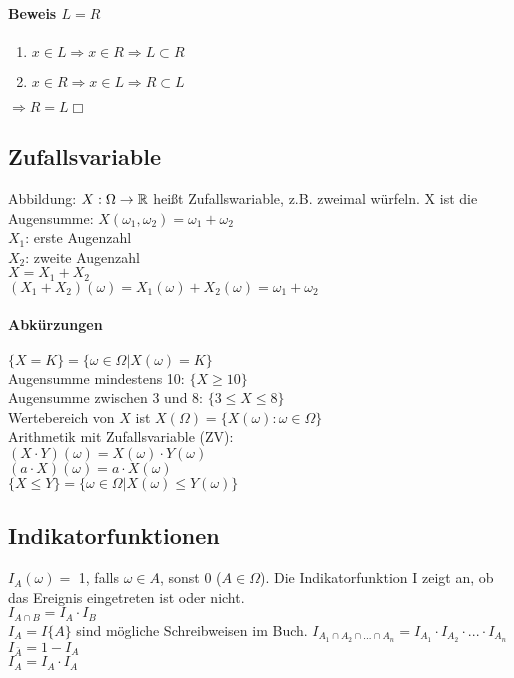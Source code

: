 \paragraph{Beweis $ L = R $}
\begin{enumerate}
\item $x \in L \Rightarrow x\in R \Rightarrow L \subset R $
\item $x \in R \Rightarrow x\in L \Rightarrow R \subset L $
\end{enumerate}
$\Rightarrow R=L \Box$\\

\subsection{Zufallsvariable}

Abbildung: $ X: \Omega \rightarrow \mathbb{R}$ heißt Zufallswariable, z.B. zweimal würfeln. X ist die Augensumme: $ X(\omega_1, \omega_2) = \omega_1+\omega_2$\\
$ X_1$: erste Augenzahl\\
$ X_2$: zweite Augenzahl\\
$X = X_1+X_2$\\
$(X_1 + X_2)(\omega) = X_1(\omega) + X_2(\omega) = \omega_1 + \omega_2$\\

\paragraph{Abkürzungen}
$ \{X=K\} = \{\omega\in\Omega | X(\omega) = K\}$\\
Augensumme mindestens 10: $ \{X \geq 10\} $\\
Augensumme zwischen 3 und 8: $ \{3 \leq X \leq 8\}$\\
Wertebereich von $X$ ist $X(\Omega) = \{ X(\omega) : \omega \in \Omega \} $ \\
Arithmetik mit Zufallsvariable (ZV): \\
$ (X\cdot Y)(\omega) = X(\omega) \cdot Y(\omega)$\\
$ (a \cdot X)(\omega) = a \cdot X(\omega)$\\
$ \{X\leq Y\} = \{\omega\in\Omega | X(\omega) \leq Y(\omega) \}$\\
 
\subsection{Indikatorfunktionen}
$ I_{A}(\omega) = $ 1, falls $ \omega\in A $, sonst 0 ($A\in \Omega$). Die Indikatorfunktion I zeigt an, ob das Ereignis eingetreten ist oder nicht. \\
$ I_{A\cap B} = I_A \cdot I_B $\\
$ I_A = I\{A\} $ sind mögliche Schreibweisen im Buch. 
$ I_{A_1\cap A_2\cap ... \cap A_n} = I_{A_1}\cdot I_{A_2}\cdot ... \cdot I_{A_n} $\\
$ I_{\bar{A}} = 1 - I_A $\\
$ I_A = I_A \cdot I_A$

